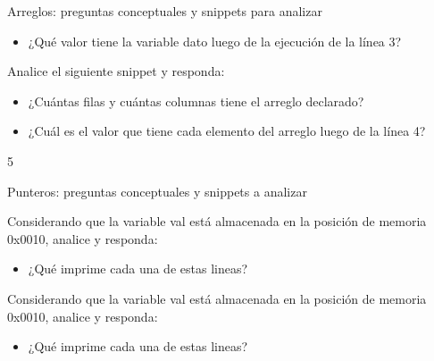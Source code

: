 \documentclass[xcolor=pdftex,table,11pt]{beamer}
\begin{document}
\begin{frame}[allowframebreaks]{Arreglos: preguntas conceptuales y snippets para analizar}
\codesetstylefrombeamer
{}


\begin{itemize}

\item ¿Qué valor tiene la variable dato luego de la ejecución de la línea 3?


\end{itemize}


\newpage

Analice el siguiente snippet y responda:

\codesetstylefrombeamer
{}


\begin{itemize}

\item ¿Cuántas filas y cuántas columnas tiene el arreglo declarado?

\item ¿Cuál es el valor que tiene cada elemento del arreglo luego de la línea 4?


\end{itemize}

5\end{frame}

\begin{frame}[allowframebreaks]{Punteros: preguntas conceptuales y snippets a analizar}

\newpage
Considerando que la variable val está almacenada en la posición de memoria 0x0010, analice y responda:

\codesetstylefrombeamer
{}


\begin{itemize}

\item ¿Qué imprime cada una de estas lineas?


\end{itemize}



\newpage
Considerando que la variable val está almacenada en la posición de memoria 0x0010, analice y responda:

\codesetstylefrombeamer
{}


\begin{itemize}

\item ¿Qué imprime cada una de estas lineas?


\end{itemize}

\end{frame}
\end{document}
